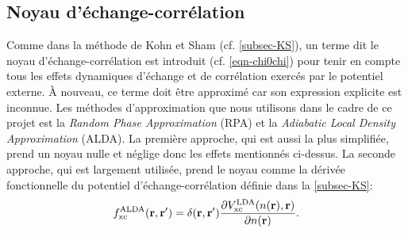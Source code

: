 \subsection{Noyau d'échange-corrélation}
Comme dans la méthode de Kohn et Sham (cf. \cref{subsec-KS}),
un terme dit le noyau d'échange-corrélation est introduit (cf. \cref{eqn-chi0chi})
pour tenir en compte tous les effets dynamiques d'échange et de corrélation
exercés par le potentiel externe.
À nouveau, ce terme doit être approximé car son expression explicite est inconnue.
Les méthodes d'approximation que nous utilisons dans le cadre de ce projet est
la \textit{Random Phase Approximation} (RPA) et
la \textit{Adiabatic Local Density Approximation} (ALDA).
La première approche, qui est aussi la plus simplifiée, prend un noyau nulle et
néglige donc les effets mentionnés ci-dessus.
La seconde approche, qui est largement utilisée,
prend le noyau comme la dérivée fonctionnelle du potentiel d'échange-corrélation
définie dans la \cref{subsec-KS}:
\begin{equation*}
  f_{\textnormal{xc}}^{\textnormal{ALDA}}(\vb{r}, \vb{r}')
  = \delta(\vb{r}, \vb{r}')\pdv{V_{\textnormal{xc}}^{\textnormal{LDA}}(n(\vb{r}), \vb{r})}{n(\vb{r})}.
\end{equation*}
